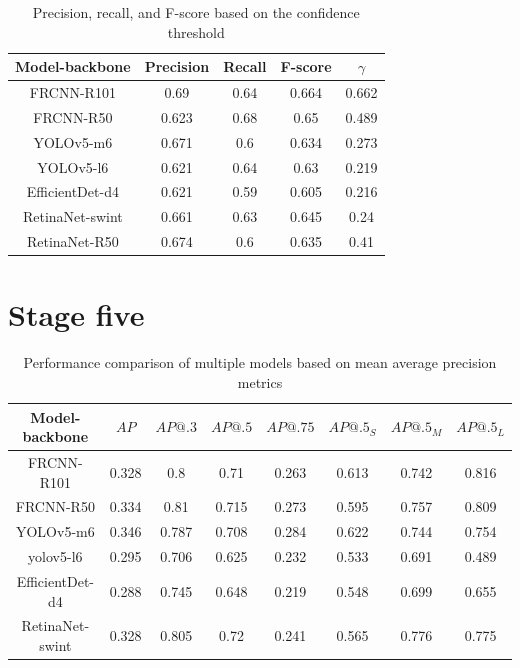 \begin{table}[H]
    \begin{tabular}{|c||c|c|c|c|}
        \hline
        Model-backbone  & Precision & Recall & F-score & $\gamma$ \\ \hline
        FRCNN-R101      & 0.69      & 0.64   & 0.664   & 0.662    \\ \hline
        FRCNN-R50       & 0.623     & 0.68   & 0.65    & 0.489    \\ \hline
        YOLOv5-m6       & 0.671     & 0.6    & 0.634   & 0.273    \\ \hline
        YOLOv5-l6       & 0.621     & 0.64   & 0.63    & 0.219    \\ \hline
        EfficientDet-d4 & 0.621     & 0.59   & 0.605   & 0.216    \\ \hline
        RetinaNet-swint & 0.661     & 0.63   & 0.645   & 0.24     \\ \hline
        RetinaNet-R50   & 0.674     & 0.6    & 0.635   & 0.41     \\ \hline
    \end{tabular}
    \caption{Precision, recall, and F-score based on the confidence threshold}
    \label{tab:model_prf:stage_four}
\end{table}

\section{Stage five}

\begin{table}[H]
    \begin{tabular}{|c|c|c|c|c|c|c|c|}
        \hline
        Model-backbone  & $AP$  & $AP@.3$ & $AP@.5$ & $AP@.75$ & $AP@.5_S$ & $AP@.5_M$ & $AP@.5_L$ \\ \hline
        FRCNN-R101      & 0.328 & 0.8     & 0.71    & 0.263    & 0.613     & 0.742     & 0.816     \\ \hline
        FRCNN-R50       & 0.334 & 0.81    & 0.715   & 0.273    & 0.595     & 0.757     & 0.809     \\ \hline
        YOLOv5-m6       & 0.346 & 0.787   & 0.708   & 0.284    & 0.622     & 0.744     & 0.754     \\ \hline
        yolov5-l6       & 0.295 & 0.706   & 0.625   & 0.232    & 0.533     & 0.691     & 0.489     \\ \hline
        EfficientDet-d4 & 0.288 & 0.745   & 0.648   & 0.219    & 0.548     & 0.699     & 0.655     \\ \hline
        RetinaNet-swint & 0.328 & 0.805   & 0.72    & 0.241    & 0.565     & 0.776     & 0.775     \\ \hline
    \end{tabular}
    \caption{Performance comparison of multiple models based on mean average precision metrics}
    \label{tab:model_results:stage_five}
\end{table}

